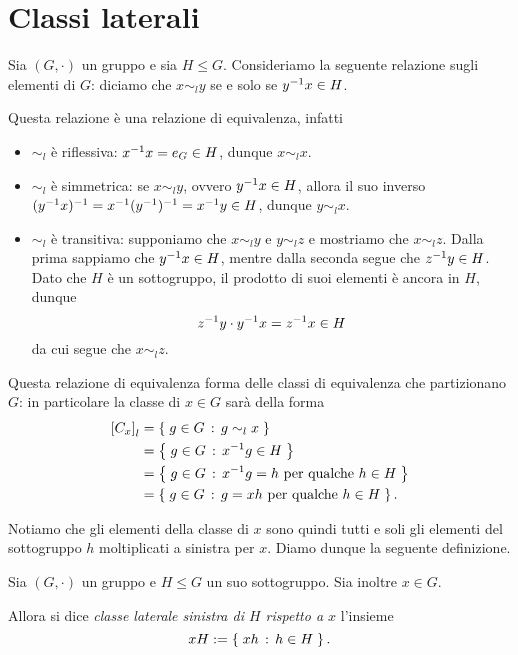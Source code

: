 \section{Classi laterali}

Sia $(G, \cdot)$ un gruppo e sia $H \leq G$. Consideriamo la seguente relazione sugli elementi di $G$: diciamo che $x \sim_l y$ se e solo se $y^{-1} x \in H$.

Questa relazione è una relazione di equivalenza, infatti \begin{itemize}
    \item $\sim_l$ è riflessiva: $x^{-1} x = e_G \in H$, dunque $x \sim_l x$.
    \item $\sim_l$ è simmetrica: se $x \sim_l y$, ovvero $y^{-1} x \in H$, allora il suo inverso $(y^{-1} x)^{-1} = x^{-1} (y^{-1})^{-1} = x^{-1} y \in H$, dunque $y \sim_l x$.
    \item $\sim_l$ è transitiva: supponiamo che $x \sim_l y$ e $y \sim_l z$ e mostriamo che $x \sim_l z$. Dalla prima sappiamo che $y^{-1} x \in H$, mentre dalla seconda segue che $z^{-1} y \in H$. Dato che $H$ è un sottogruppo, il prodotto di suoi elementi è ancora in $H$, dunque \[
        z^{-1} y \cdot y^{-1} x = z^{-1} x \in H    
    \] da cui segue che $x \sim_l z$.
\end{itemize}

Questa relazione di equivalenza forma delle classi di equivalenza che partizionano $G$: in particolare la classe di $x \in G$ sarà della forma \begin{align*}
    \eqclass*{x}_l &= \set{g \in G \suchthat g \sim_l x}\\
    &= \set{g \in G \suchthat x\inv g \in H}\\
    &= \set{g \in G \suchthat x\inv g = h \text{ per qualche } h \in H}\\
    &= \set{g \in G \suchthat g = xh \text{ per qualche } h \in H}.
\end{align*}

Notiamo che gli elementi della classe di $x$ sono quindi tutti e soli gli elementi del sottogruppo $h$ moltiplicati a sinistra per $x$.
Diamo dunque la seguente definizione.
\begin{definition}
    Sia $(G, \cdot)$ un gruppo e $H \leq G$ un suo sottogruppo. Sia inoltre $x \in G$.
    
    Allora si dice \emph{classe laterale sinistra di $H$ rispetto a $x$} l'insieme \[
        xH := \left\{\;xh \,:\, h \in H\;\right\}. 
    \]
\end{definition}

